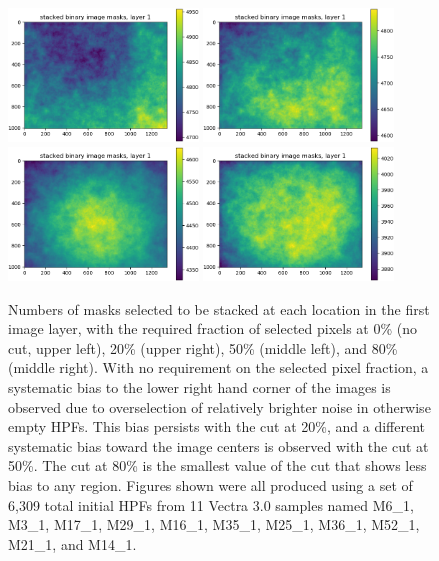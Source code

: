 \documentclass[letterpaper,11pt]{article}
\begin{document}
\begin{figure}[!ht]
\centering
\includegraphics[width=0.45\textwidth]{images/measuring_flatfield_corrections/example_mask_stack_layer_1_cut_at_0_00}
\includegraphics[width=0.45\textwidth]{images/measuring_flatfield_corrections/example_mask_stack_layer_1_cut_at_0_20}
\includegraphics[width=0.45\textwidth]{images/measuring_flatfield_corrections/example_mask_stack_layer_1_cut_at_0_50}
\includegraphics[width=0.45\textwidth]{images/measuring_flatfield_corrections/example_mask_stack_layer_1_cut_at_0_80}
\caption{\footnotesize Numbers of masks selected to be stacked at each location in the first image layer, with the required fraction of selected pixels at 0\% (no cut, upper left), 20\% (upper right), 50\% (middle left), and 80\% (middle right). With no requirement on the selected pixel fraction, a systematic bias to the lower right hand corner of the images is observed due to overselection of relatively brighter noise in otherwise empty HPFs. This bias persists with the cut at 20\%, and a different systematic bias toward the image centers is observed with the cut at 50\%. The cut at 80\% is the smallest value of the cut that shows less bias to any region. Figures shown were all produced using a set of 6,309 total initial HPFs from 11 Vectra 3.0 samples named M6\_1, M3\_1, M17\_1, M29\_1, M16\_1, M35\_1, M25\_1, M36\_1, M52\_1, M21\_1, and M14\_1.}
\label{fig:selected_pixel_fraction_cut_1}
\end{figure}
\end{document}
